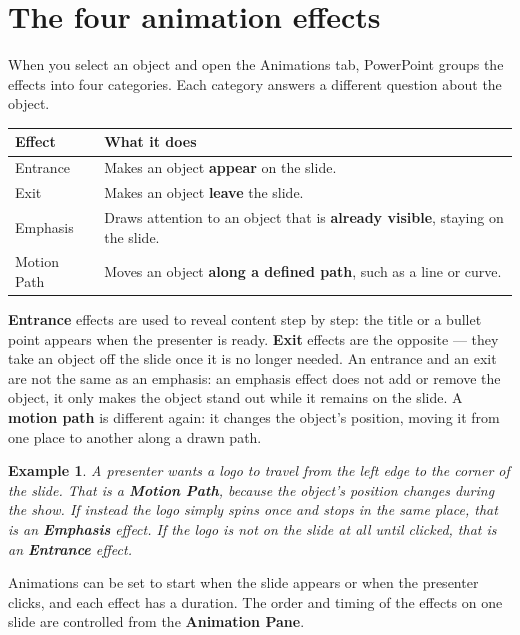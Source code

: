 \documentclass[11pt]{article}
\newtheorem{example}{Example}[section]
\begin{document}
\section{The four animation effects}
When you select an object and open the Animations tab, PowerPoint groups the
effects into four categories. Each category answers a different question about
the object.

\begin{center}
\begin{tabular}{p{}p{}}
\toprule
\textbf{Effect} & \textbf{What it does} \\
\midrule
Entrance & Makes an object \textbf{appear} on the slide. \\
Exit & Makes an object \textbf{leave} the slide. \\
Emphasis & Draws attention to an object that is \textbf{already visible},
staying on the slide. \\
Motion Path & Moves an object \textbf{along a defined path}, such as a line or
curve. \\
\bottomrule
\end{tabular}
\end{center}

\textbf{Entrance} effects are used to reveal content step by step: the title or
a bullet point appears when the presenter is ready. \textbf{Exit} effects are
the opposite --- they take an object off the slide once it is no longer needed.
An entrance and an exit are not the same as an emphasis: an emphasis effect
does not add or remove the object, it only makes the object stand out while it
remains on the slide. A \textbf{motion path} is different again: it changes the
object's position, moving it from one place to another along a drawn path.

\begin{example}
A presenter wants a logo to travel from the left edge to the corner of the
slide. That is a \textbf{Motion Path}, because the object's position changes
during the show. If instead the logo simply spins once and stops in the same
place, that is an \textbf{Emphasis} effect. If the logo is not on the slide at
all until clicked, that is an \textbf{Entrance} effect.
\end{example}

Animations can be set to start when the slide appears or when the presenter
clicks, and each effect has a duration. The order and timing of the effects on
one slide are controlled from the \textbf{Animation Pane}.
\end{document}
